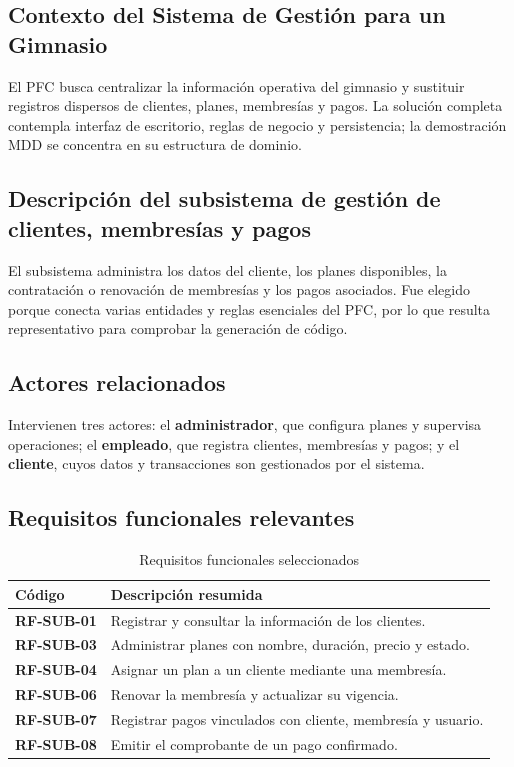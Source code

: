 \documentclass[12pt,a4paper]{article}
\begin{document}
\subsection{Contexto del Sistema de Gestión para un Gimnasio}

El PFC busca centralizar la información operativa del gimnasio y sustituir
registros dispersos de clientes, planes, membresías y pagos. La solución
completa contempla interfaz de escritorio, reglas de negocio y persistencia;
la demostración MDD se concentra en su estructura de dominio.

\subsection{Descripción del subsistema de gestión de clientes, membresías y pagos}

El subsistema administra los datos del cliente, los planes disponibles, la
contratación o renovación de membresías y los pagos asociados. Fue elegido
porque conecta varias entidades y reglas esenciales del PFC, por lo que resulta
representativo para comprobar la generación de código.

\subsection{Actores relacionados}

Intervienen tres actores: el \textbf{administrador}, que configura planes y
supervisa operaciones; el \textbf{empleado}, que registra clientes,
membresías y pagos; y el \textbf{cliente}, cuyos datos y transacciones son
gestionados por el sistema.

\subsection{Requisitos funcionales relevantes}

\begin{table}[htbp]
  \centering
  \caption{Requisitos funcionales seleccionados}
  \label{tab:requisitos-subsistema}
  \footnotesize
  \begin{tabularx}{\textwidth}{>{\bfseries}p{2.2cm}X}
    \toprule
    Código & Descripción resumida \\
    \midrule
    RF-SUB-01 & Registrar y consultar la información de los clientes. \\
    RF-SUB-03 & Administrar planes con nombre, duración, precio y estado. \\
    RF-SUB-04 & Asignar un plan a un cliente mediante una membresía. \\
    RF-SUB-06 & Renovar la membresía y actualizar su vigencia. \\
    RF-SUB-07 & Registrar pagos vinculados con cliente, membresía y usuario. \\
    RF-SUB-08 & Emitir el comprobante de un pago confirmado. \\
    \bottomrule
  \end{tabularx}
\end{table}
\end{document}
